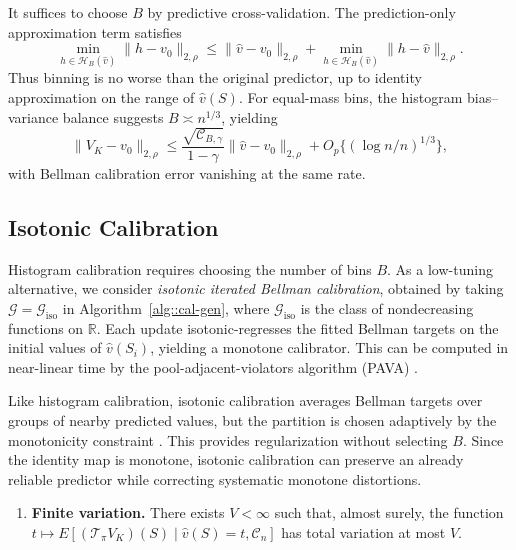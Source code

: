 \documentclass{article}
\theoremstyle{plain}
\theoremstyle{definition}
\theoremstyle{remark}
\begin{document}
It suffices to choose \(B\) by predictive cross-validation. The prediction-only approximation term
satisfies
\[
\min_{h\in\mathcal H_B(\hat v)}\|h-v_0\|_{2,\rho}
\le
\|\hat v-v_0\|_{2,\rho}
+
\min_{h\in\mathcal H_B(\hat v)}\|h-\hat v\|_{2,\rho}.
\]
Thus binning is no worse than the original predictor, up to identity
approximation on the range of \(\hat v(S)\). For equal-mass bins, the histogram
bias--variance balance suggests \(B\asymp n^{1/3}\), yielding
\citep{gyorfi2002distribution}
\[
\|V_K-v_0\|_{2,\rho}
\le
\frac{\sqrt{\mathcal C_{B,\gamma}}}{1-\gamma}
\|\hat v-v_0\|_{2,\rho}
+
O_p\{(\log n/n)^{1/3}\},
\]
with Bellman calibration error vanishing at the same rate.


 


\subsection{Isotonic Calibration}

Histogram calibration requires choosing the number of bins \(B\). As a
low-tuning alternative, we consider \emph{isotonic iterated Bellman
calibration}, obtained by taking
\(\mathcal G=\mathcal G_{\mathrm{iso}}\) in
Algorithm~\ref{alg::cal-gen}, where \(\mathcal G_{\mathrm{iso}}\) is the class
of nondecreasing functions on \(\mathbb R\). Each update isotonic-regresses the
fitted Bellman targets on the initial values of \(\hat v(S_i)\), yielding a
monotone calibrator. This can be computed in near-linear time by the
pool-adjacent-violators algorithm (PAVA) \citep{best1990active}.

Like histogram calibration, isotonic calibration averages Bellman targets over
groups of nearby predicted values, but the partition is chosen adaptively by the
monotonicity constraint \citep{barlow1972isotonic}. This provides
regularization without selecting \(B\). Since the identity map is monotone,
isotonic calibration can preserve an already reliable predictor while correcting
systematic monotone distortions.

\begin{enumerate}[label=\textbf{C\arabic*}, ref={C\arabic*}, leftmargin=1.5em, resume=cond]
\item \label{cond::C3}
\textbf{Finite variation.}
There exists \(V<\infty\) such that, almost surely, the function $t
\mapsto
E\!\left[
(\mathcal T_\pi V_K)(S)
\mid
\hat v(S)=t,\mathcal C_n
\right]$
has total variation at most \(V\).
\end{enumerate}
\end{document}
